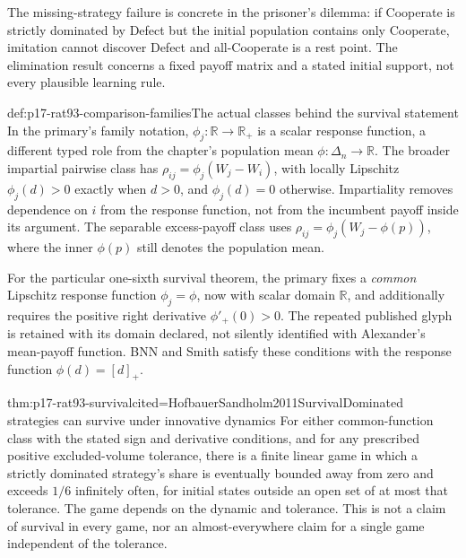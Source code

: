The missing-strategy failure is concrete in the prisoner's dilemma:
if Cooperate is strictly dominated by Defect but the initial population
contains only Cooperate, imitation cannot discover Defect and all-Cooperate
is a rest point. The elimination result concerns a fixed payoff matrix
and a stated initial support, not every plausible learning rule.
\cite[Theorem~4, p.~557]{Alexander2021EvolutionaryGames}

\begin{hbdefinition}{def:p17-rat93-comparison-families}{The actual classes behind the survival statement}
In the primary's family notation, \(\phi_j:\mathbb R\to\mathbb R_+\)
is a scalar response function, a different typed role from the chapter's
population mean \(\phi:\Delta_n\to\mathbb R\).
The broader impartial pairwise class has
\(\rho_{ij}=\phi_j(W_j-W_i)\), with locally Lipschitz
\(\phi_j(d)>0\) exactly when \(d>0\), and \(\phi_j(d)=0\) otherwise.
Impartiality removes dependence on \(i\) from the response function,
not from the incumbent payoff inside its argument. The separable
excess-payoff class uses \(\rho_{ij}=\phi_j(W_j-\phi(p))\), where
the inner \(\phi(p)\) still denotes the population mean.

For the particular one-sixth survival theorem, the primary fixes a
\emph{common} Lipschitz response function \(\phi_j=\phi\), now
with scalar domain \(\mathbb R\), and additionally requires
the positive right derivative \(\phi'_+(0)>0\). The repeated
published glyph is retained with its domain declared, not silently
identified with Alexander's mean-payoff function. BNN and Smith satisfy
these conditions with the response function \(\phi(d)=[d]_+\).
\end{hbdefinition}

\begin{hbtheorem}{thm:p17-rat93-survival}{cited=HofbauerSandholm2011Survival}{Dominated strategies can survive under innovative dynamics}
For either common-function class with the stated sign and derivative
conditions, and for any prescribed positive excluded-volume tolerance,
there is a finite linear game in which a strictly dominated strategy's
share is eventually bounded away from zero and exceeds \(1/6\)
infinitely often, for initial states outside an open set of at most
that tolerance. The game depends on the dynamic and tolerance.
This is not a claim of survival in every game, nor an almost-everywhere
claim for a single game independent of the tolerance.
\end{hbtheorem}

